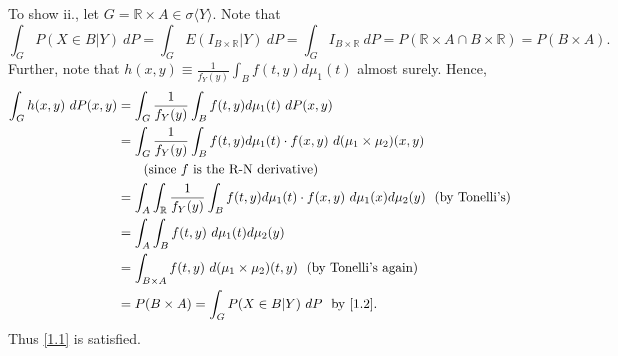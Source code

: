 \documentclass[12pt]{article}
\begin{document}
To show ii., let $G = \mathbb{R} \times A \in \sigma \langle Y \rangle$. Note that 
\begin{equation}
  \int_{G}P(X\in B | Y)\ dP = \int_{G}E(I_{B\times \mathbb{R}}|Y)\ dP = \int_{G}I_{B\times \mathbb{R}}\ dP = P(\mathbb{R}\times A \cap B \times
  \mathbb{R}) = P(B\times A).
  \label{1.2}
\end{equation}
Further, note that $h(x,y) \equiv \frac{1}{f_{Y}(y)}\int_{B}f(t,y)d\mu_{1}(t)$ almost surely. Hence,
\begin{align*}
  \int_{G}h(x,y)\ dP(x,y) & = \int_{G}\frac{1}{f_{Y}(y)}\int_{B}f(t,y)d\mu_{1}(t)\ dP(x,y) \\
  & = \int_{G}\frac{1}{f_{Y}(y)}\int_{B}f(t,y)d\mu_{1}(t) \cdot f(x,y)\ d(\mu_{1}\times \mu_{2})(x,y) \\
  & \qquad \text{(since $f$ is the R-N derivative)} \\
  & = \int_{A}\int_{\mathbb{R}}\frac{1}{f_{Y}(y)}\int_{B}f(t,y)d\mu_{1}(t)\cdot f(x,y)\ d\mu_{1}(x)d\mu_{2}(y) \ \ \text{(by Tonelli's)} \\
  & = \int_{A}\int_{B}f(t,y)\ d\mu_{1}(t)d\mu_{2}(y) \\
  & = \int_{B\times A}f(t,y)\ d(\mu_{1}\times \mu_{2})(t,y) \ \ \text{(by Tonelli's again)} \\
  & = P(B\times A) = \int_{G}P(X \in B| Y) \ dP \ \ \text{by \eqref{1.2}.}
\end{align*}
Thus \eqref{1.1} is satisfied.
\end{document}
